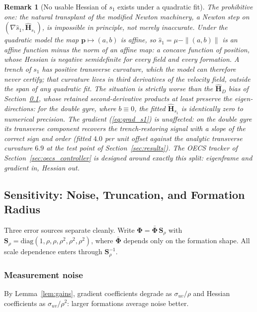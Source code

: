 \documentclass[lettersize,journal]{IEEEtran}
\newtheorem{remark}{Remark}
\begin{document}
\begin{remark}[No usable Hessian of $s_1$ exists under a quadratic fit]
\label{rem:s1hess}
The prohibitive one: the natural transplant of the modified Newton
machinery, a Newton step on $(\nabla \hat{s}_1, \hat{\mathbf{H}}_{s_1})$,
is impossible in principle, not merely inaccurate. Under the quadratic
model the map $\mathbf{p} \mapsto (a, b)$ is affine, so $\hat{s}_1 =
\mu - \|(a, b)\|$ is an affine function minus the norm of an affine
map: a concave function of position, whose Hessian is negative
semidefinite \emph{for every field and every formation}. A trench of
$s_1$ has positive transverse curvature, which the model can therefore
never certify; that curvature lives in third derivatives of the
velocity field, outside the span of any quadratic fit. The situation is
strictly worse than the $\hat{\mathbf{H}}_D$ bias of
Section~\ref{sec:sensitivity}, whose retained second-derivative
products at least preserve the eigen-directions: for the double gyre,
where $b \equiv 0$, the fitted $\hat{\mathbf{H}}_{s_1}$ is identically
zero to numerical precision. The gradient (\ref{eq:grad_s1}) is
unaffected: on the double gyre its transverse component recovers the
trench-restoring signal with a slope of the correct sign and order
(fitted $4.0$ per unit offset against the analytic transverse curvature
$6.9$ at the test point of Section~\ref{sec:results}). The OECS tracker
of Section~\ref{sec:oecs_controller} is designed around exactly this
split: eigenframe and gradient in, Hessian out.
\end{remark}

\subsection{Sensitivity: Noise, Truncation, and Formation Radius}
\label{sec:sensitivity}

Three error sources separate cleanly. Write $\boldsymbol{\Phi} =
\bar{\boldsymbol{\Phi}}\,\mathbf{S}_\rho$ with $\mathbf{S}_\rho =
\mathrm{diag}(1, \rho, \rho, \rho^2, \rho^2, \rho^2)$, where
$\bar{\boldsymbol{\Phi}}$ depends only on the formation shape. All
scale dependence enters through $\mathbf{S}_\rho^{-1}$.

\subsubsection{Measurement noise}
By Lemma~\ref{lem:gains}, gradient coefficients degrade as
$\sigma_{uv}/\rho$ and Hessian coefficients as $\sigma_{uv}/\rho^2$:
larger formations average noise better.
\end{document}
